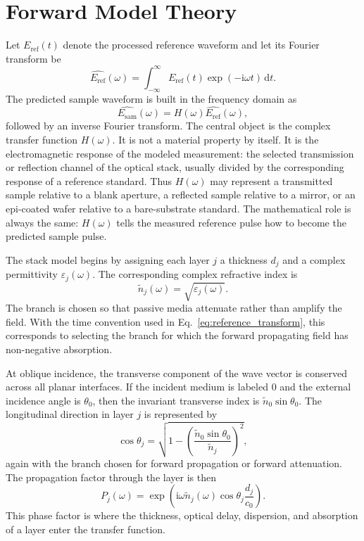 \documentclass[11pt]{article}
\newcommand{\eref}{E_{\mathrm{ref}}}
\newcommand{\esam}{E_{\mathrm{sam}}}
\newcommand{\eps}{\varepsilon}
\newcommand{\nt}{\tilde{n}}
\newcommand{\ii}{\mathrm{i}}
\newcommand{\dd}{\mathrm{d}}
\newcommand{\clight}{c_0}
\begin{document}
\section{Forward Model Theory}

Let \(\eref(t)\) denote the processed reference waveform and let its Fourier transform be
\begin{equation}
  \hat{\eref}(\omega)
  =
  \int_{-\infty}^{\infty}\eref(t)\exp(-\ii\omega t)\,\dd t .
  \label{eq:reference_transform}
\end{equation}
The predicted sample waveform is built in the frequency domain as
\begin{equation}
  \hat{\esam}(\omega)
  =
  H(\omega)\hat{\eref}(\omega),
  \label{eq:sample_spectrum}
\end{equation}
followed by an inverse Fourier transform. The central object is the complex transfer function \(H(\omega)\). It is not a material property by itself. It is the electromagnetic response of the modeled measurement: the selected transmission or reflection channel of the optical stack, usually divided by the corresponding response of a reference standard. Thus \(H(\omega)\) may represent a transmitted sample relative to a blank aperture, a reflected sample relative to a mirror, or an epi-coated wafer relative to a bare-substrate standard. The mathematical role is always the same: \(H(\omega)\) tells the measured reference pulse how to become the predicted sample pulse.

The stack model begins by assigning each layer \(j\) a thickness \(d_j\) and a complex permittivity \(\eps_j(\omega)\). The corresponding complex refractive index is
\begin{equation}
  \nt_j(\omega)=\sqrt{\eps_j(\omega)} .
  \label{eq:complex_index}
\end{equation}
The branch is chosen so that passive media attenuate rather than amplify the field. With the time convention used in Eq.~\eqref{eq:reference_transform}, this corresponds to selecting the branch for which the forward propagating field has non-negative absorption.

At oblique incidence, the transverse component of the wave vector is conserved across all planar interfaces. If the incident medium is labeled \(0\) and the external incidence angle is \(\theta_0\), then the invariant transverse index is \(\nt_0\sin\theta_0\). The longitudinal direction in layer \(j\) is represented by
\begin{equation}
  \cos\theta_j
  =
  \sqrt{
    1-
    \left(
      \frac{\nt_0\sin\theta_0}{\nt_j}
    \right)^2
  },
  \label{eq:complex_cosine}
\end{equation}
again with the branch chosen for forward propagation or forward attenuation. The propagation factor through the layer is then
\begin{equation}
  P_j(\omega)
  =
  \exp\!\left(
    \ii\omega \nt_j(\omega)\cos\theta_j
    \frac{d_j}{\clight}
  \right).
  \label{eq:propagation_factor}
\end{equation}
This phase factor is where the thickness, optical delay, dispersion, and absorption of a layer enter the transfer function.
\end{document}

